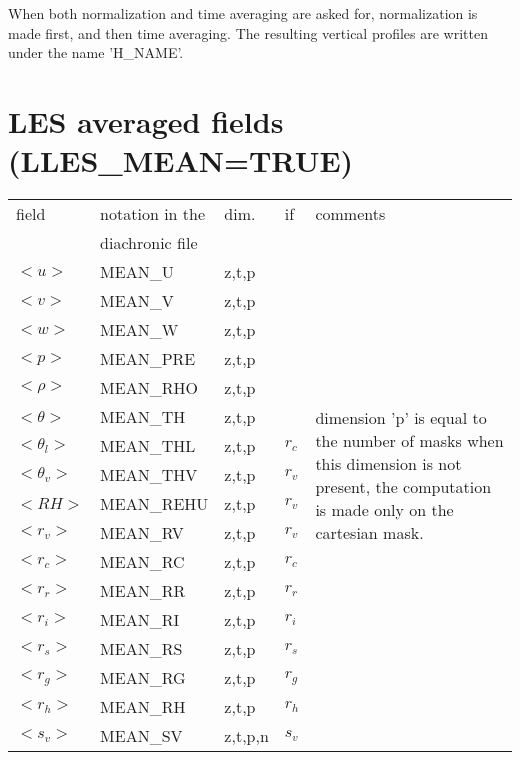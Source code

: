When both normalization and time averaging are asked for,
normalization is made first, and then time averaging. The resulting
vertical profiles are written under the name 'H\_NAME'.\\

\section{LES averaged fields (LLES\_MEAN=TRUE)}


\begin{center}
\begin{makeimage}
\begin{tabular}{||p{6cm}|>{\centering}p{2.5cm}|>{\centering}p{1.5cm}|>{\centering}p{0.5cm}|p{5cm }||}
\hline
\hline
field & notation in the & dim. &   if  & comments \\
      & diachronic file & &  & \\
\hline
\hline
$<u>$ & MEAN\_U & z,t,p & &\multirow{15}{5cm}{dimension 'p' is equal to the  number of masks when this dimension is not present, the computation is made only on the cartesian mask.}\\
\cline{1-4}
$<v>$ & MEAN\_V &z,t,p &   &  \\
\cline{1-4}
$<w>$  & MEAN\_W &z,t,p &   & \\
\cline{1-4}
$<p>$   & MEAN\_PRE &z,t,p &   & \\
\cline{1-4}
$<\rho>$   & MEAN\_RHO &z,t,p &   & \\
\cline{1-4}
$<\theta>$   & MEAN\_TH &z,t,p &   &\\
\cline{1-4}
$<\theta_l>$   & MEAN\_THL &z,t,p &  $r_c$  &\\
\cline{1-4}
$<\theta_v>$   & MEAN\_THV &z,t,p &  $r_v$  &\\
\cline{1-4}
$<RH>$   & MEAN\_REHU &z,t,p &  $r_v$  &\\
\cline{1-4}
$<r_v>$   & MEAN\_RV &z,t,p &  $r_v$  &\\
\cline{1-4}
$<r_c>$   & MEAN\_RC &z,t,p &  $r_c$  &\\
\cline{1-4}
$<r_r>$   & MEAN\_RR &z,t,p &  $r_r$  &\\
\cline{1-4}
$<r_i>$   & MEAN\_RI &z,t,p &  $r_i$  &\\
\cline{1-4}
$<r_s>$   & MEAN\_RS &z,t,p &  $r_s$  &\\
\cline{1-4}
$<r_g>$   & MEAN\_RG &z,t,p &  $r_g$  &\\
\cline{1-4}
$<r_h>$   & MEAN\_RH &z,t,p &  $r_h$  &\\
\cline{1-4}
$<s_v>$   & MEAN\_SV &z,t,p,n &  $s_v$  &\\

\end{tabular}
\end{makeimage}
\end{center}
